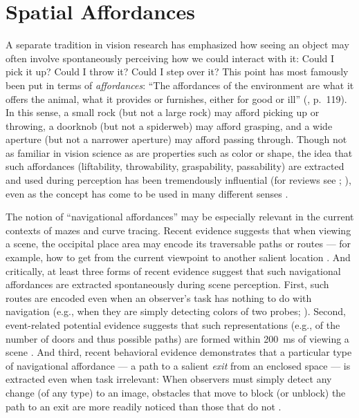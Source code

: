 \section{Spatial Affordances}
A separate tradition in vision research has emphasized how seeing an object may often involve spontaneously perceiving how we could interact with it: Could I pick it up? Could I throw it? Could I step over it? This point has most famously been put in terms of \textit{affordances}: “The affordances of the environment are what it offers the animal, what it provides or furnishes, either for good or ill” (\cite{gibson_ecological_1979}, p.~119). In this sense, a small rock (but not a large rock) may afford picking up or throwing, a doorknob (but not a spiderweb) may afford grasping, and a wide aperture (but not a narrower aperture) may afford passing through. Though not as familiar in vision science as are properties such as color or shape, the idea that such affordances (liftability, throwability, graspability, passability) are extracted and used during perception has been tremendously influential (for reviews see \cite{barsingerhorn_possibilities_2012}; \cite{warren_information_2021}), even as the concept has come to be used in many different senses \parencite{chong_evolution_2020}.\footnotemark


The notion of “navigational affordances” may be especially relevant in the current contexts of mazes and curve tracing. Recent evidence suggests that when viewing a scene, the occipital place area may encode its traversable paths or routes --- for example, how to get from the current viewpoint to another salient location \parencite{bonner_coding_2017}. And critically, at least three forms of recent evidence suggest that such navigational affordances are extracted spontaneously during scene perception. First, such routes are encoded even when an observer’s task has nothing to do with navigation (e.g., when they are simply detecting colors of two probes; \cite{bonner_coding_2017}). Second, event-related potential evidence suggests that such representations (e.g., of the number of doors and thus possible paths) are formed within \qty{200}{\milli\second} of viewing a scene \parencite{harel_early_2022}. And third, recent behavioral evidence demonstrates that a particular type of navigational affordance --- a path to a salient \textit{exit} from an enclosed space --- is extracted even when task irrelevant: When observers must simply detect any change (of any type) to an image, obstacles that move to block (or unblock) the path to an exit are more readily noticed than those that do not \parencite{belledonne_automatic_2021, belledonne_navigational_2022}.


